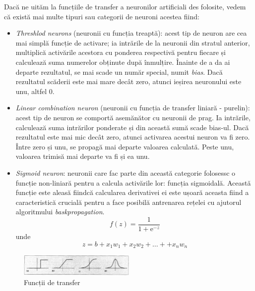 Dacă ne uităm la funcțiile de transfer a neuronilor artificiali des folosite, vedem că există mai multe tipuri sau categorii de neuroni acestea fiind:

\begin{itemize}
	\item \textit{Threshlod neurons} (neuronii cu funcția treaptă): acest tip de neuron are cea mai simplă funcție de activare; ia intrările de la neuronii din stratul anterior, multiplică activările acestora cu ponderea respectivă pentru fiecare și calculează suma numerelor obținute după înmulțire. Înainte de a da ai departe rezultatul, se mai scade un număr special, numit \textit{bias}. Dacă rezultatul scăderii este mai mare decât zero, atunci ieșirea neuronului este unu, altfel 0.
	\item \textit{Linear combination neuron} (neuronii cu funcția de transfer liniară - purelin): acest tip de neuron se comportă asemănător cu neuronii de prag. Ia intrările, calculează suma intrărilor ponderate și din această sumă scade bias-ul. Dacă rezultatul este mai mic decât zero, atunci activarea acestui neuron va fi zero. Între zero și unu, se propagă mai departe valoarea calculată. Peste unu, valoarea trimisă mai departe va fi și ea unu.
	\item \textit{Sigmoid neuron}:  neuronii care fac parte din această categorie folosessc o funcție non-liniară pentru a calcula activările lor: funcția sigmoidală. Această funcție este aleasă fiindcă calcularea derivativei ei este ușoară aceasta fiind a caracteristică crucială pentru a face posibilă antrenarea rețelei cu ajutorul algoritmului \textit{baskpropagation}.
\begin{equation}
	f(z) = \frac{1}{1 + \mathrm{e}^{-z}}
\end{equation}
unde
\begin{equation}
	z = b + x_1w_1 +  x_2w_2 + \dots + + x_nw_n
\end{equation}
\end{itemize}

\begin{figure}[h!]
    	\centering
	\captionsetup{justification=centering, margin=2cm}
	\includegraphics[width=0.5\textwidth]{figures/activation_functions.png}
	\caption{Funcții de transfer \cite{activationFunctions}}
	\label{fig:activationFunctions}
\end{figure}


